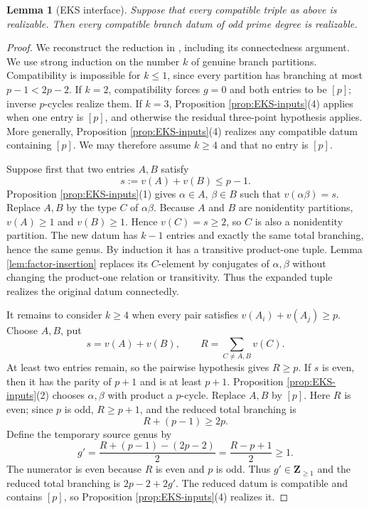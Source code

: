 \documentclass[10pt,a4paper]{amsart}
\newtheorem{lemma}[theorem]{Lemma}
\numberwithin{equation}{section}
\begin{document}
\begin{lemma}[EKS interface]\label{lem:EKS}
Suppose that every compatible triple as above is realizable.  Then every
compatible branch datum of odd prime degree is realizable.
\end{lemma}

\begin{proof}
We reconstruct the reduction in \cite[Sections 4--5]{EKS}, including its
connectedness argument.  We use strong induction on the number $k$ of
genuine branch partitions.  Compatibility is impossible for $k\leq1$, since
every partition has branching at most $p-1<2p-2$.  If $k=2$, compatibility
forces $g=0$ and both entries to be $[p]$; inverse $p$-cycles realize them.
If $k=3$, Proposition \ref{prop:EKS-inputs}(4) applies when one entry is
$[p]$, and otherwise the residual three-point hypothesis applies.  More
generally, Proposition \ref{prop:EKS-inputs}(4) realizes any compatible datum
containing $[p]$.  We may therefore assume
$k\geq4$ and that no entry is $[p]$.

Suppose first that two entries $A,B$ satisfy
\[
 s:=v(A)+v(B)\leq p-1.
\]
Proposition \ref{prop:EKS-inputs}(1) gives $\alpha\in A$, $\beta\in B$ such that
$v(\alpha\beta)=s$.  Replace $A,B$ by the type $C$ of $\alpha\beta$.
Because $A$ and $B$ are nonidentity partitions, $v(A)\geq1$ and
$v(B)\geq1$.  Hence $v(C)=s\geq2$, so $C$ is also a nonidentity partition.
The new datum has $k-1$ entries and exactly the same total branching, hence
the same genus.  By induction it has a transitive product-one tuple.  Lemma
\ref{lem:factor-insertion} replaces its $C$-element by conjugates of
$\alpha,\beta$ without changing the product-one relation or transitivity.
Thus the expanded tuple realizes the original datum connectedly.

It remains to consider $k\geq4$ when every pair satisfies
$v(A_i)+v(A_j)\geq p$.  Choose $A,B$, put
\[
 s=v(A)+v(B),\qquad
 R=\sum_{C\ne A,B}v(C).
\]
At least two entries remain, so the pairwise hypothesis gives $R\geq p$.
If $s$ is even, then it has the parity of $p+1$ and is at least $p+1$.
Proposition \ref{prop:EKS-inputs}(2) chooses $\alpha,\beta$ with product a
$p$-cycle.  Replace
$A,B$ by $[p]$.  Here $R$ is even; since $p$ is odd, $R\geq p+1$, and the
reduced total branching is
\[
 R+(p-1)\geq2p.
\]
Define the temporary source genus by
\[
 g'=\frac{R+(p-1)-(2p-2)}2=\frac{R-p+1}{2}\geq1.
\]
The numerator is even because $R$ is even and $p$ is odd.  Thus
$g'\in\mathbf Z_{\geq1}$ and the reduced total branching is
$2p-2+2g'$.  The reduced datum is compatible and contains $[p]$, so
Proposition \ref{prop:EKS-inputs}(4) realizes it.


\end{proof}
\end{document}
